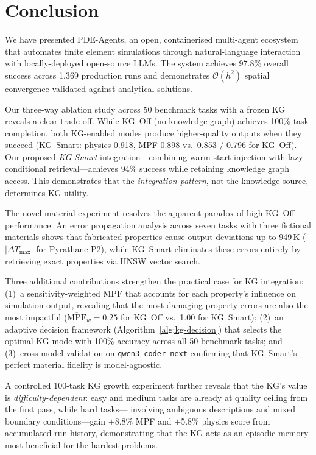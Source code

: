 \documentclass[twocolumn]{article}
\begin{document}
\section{Conclusion}
\label{sec:conclusion}

We have presented PDE-Agents, an open, containerised multi-agent ecosystem
that automates finite element simulations through natural-language interaction
with locally-deployed open-source LLMs.  The system achieves 97.8\% overall
success across 1{,}369 production runs and demonstrates $\mathcal{O}(h^2)$
spatial convergence validated against analytical solutions.

Our three-way ablation study across 50 benchmark tasks with a frozen KG
reveals a clear trade-off.  While KG~Off (no knowledge graph) achieves
100\% task completion, both KG-enabled modes produce higher-quality
outputs when they succeed (KG~Smart: physics 0.918, MPF 0.898 vs.\ 0.853 / 0.796
for KG~Off).  Our proposed \emph{KG Smart} integration---combining
warm-start injection with lazy conditional retrieval---achieves 94\%
success while retaining
knowledge graph access.  This demonstrates that the \emph{integration
pattern}, not the knowledge source, determines KG utility.

The novel-material experiment resolves the apparent paradox of high
KG~Off performance.  An error propagation analysis across seven tasks
with three fictional materials shows that fabricated properties cause
output deviations up to 949\,K ($|\Delta T_{\max}|$ for Pyrathane P2),
while KG~Smart eliminates these errors entirely by retrieving exact
properties via HNSW vector search.

Three additional contributions strengthen the practical case for KG
integration: (1)~a sensitivity-weighted MPF that accounts for each
property's influence on simulation output, revealing that the most
damaging property errors are also the most impactful ($\overline{\text{MPF}}_w{=}0.25$
for KG~Off vs.\ 1.00 for KG~Smart); (2)~an adaptive decision framework
(Algorithm~\ref{alg:kg-decision}) that selects the optimal KG mode with
100\% accuracy across all 50 benchmark tasks; and (3)~cross-model validation on
\texttt{qwen3-coder-next} confirming that KG~Smart's perfect material
fidelity is model-agnostic.

A controlled 100-task KG growth experiment further reveals that the
KG's value is \emph{difficulty-dependent}: easy and medium tasks are
already at quality ceiling from the first pass, while hard tasks---
involving ambiguous descriptions and mixed boundary conditions---gain
$+$8.8\% MPF and $+$5.8\% physics score from accumulated run history,
demonstrating that the KG acts as an episodic memory most beneficial
for the hardest problems.
\end{document}
